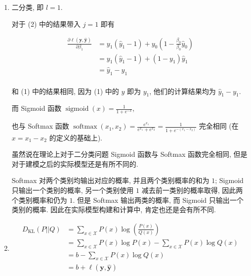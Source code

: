 \documentclass[answers]{exam}  %
\begin{document}
\begin{questions}
\begin{solution}
\begin{enumerate}
      \item

            二分类, 即 $l = 1$.

            对于 (2) 中的结果带入 $j = 1$ 即有

            $$
              \begin{aligned}
                \frac{\partial \ell(\bm{y}, \hat{\bm{y}})}{\partial \beta_1}
                 & = y_1(\hat{y}_1 - 1) + y_0(1 - \frac{\beta_0}{\beta_0}\hat{y}_0) \\
                 & = y_1(\hat{y}_1 - 1) + (1 - y_1)\hat{y}_1                        \\
                 & = \hat{y}_1 - y_{1}                                              \\
              \end{aligned}
            $$

            和 (1) 中的结果相同, 因为 (1) 中的 $y$ 即为 $y_1$, 他们的计算结果均为 $\hat{y}_1 - y_1$.

            而 Sigmoid 函数 $\displaystyle \operatorname{sigmoid}(x) = \frac{1}{1 + e^{-x}}$,

            也与 Softmax 函数 $\displaystyle \operatorname{softmax}(x_1, x_2) = \frac{e^{x_1}}{e^{x_1} + e^{x_2}} = \frac{1}{1 + e^{-(x_1-x_2)}}$ 完全相同 (在 $x = x_1 - x_2$ 的定义的基础上).

            虽然说在理论上对于二分类问题 Sigmoid 函数与 Softmax 函数完全相同, 但是对于建模之后的实际模型还是有所不同的.

            Softmax 对两个类别均输出对应的概率, 并且两个类别概率的和为 $1$; Sigmoid 只输出一个类别的概率, 另一个类别使用 $1$ 减去前一类别的概率取得, 因此两个类别概率和仍为 $1$. 但是 Softmax 输出两类的概率, 而 Sigmoid 只输出一个类别的概率. 因此在实际模型构建和计算中, 肯定也还是会有所不同.

      \item

            $$
              \begin{aligned}
                \displaystyle D_{\mathrm{KL}}(P || Q) & = \sum_{x \in \mathcal{X}}P(x)\log(\frac{P(x)}{Q(x)})                           \\
                                                      & = \sum_{x \in \mathcal{X}}P(x)\log P(x) - \sum_{x \in \mathcal{X}}P(x)\log Q(x) \\
                                                      & = b - \sum_{x \in \mathcal{X}}P(x)\log Q(x)                                     \\
                                                      & = b + \ell(\bm{y}, \hat{\bm{y}})                                                \\
              \end{aligned}
            $$


\end{enumerate}
\end{solution}
\end{questions}
\end{document}
